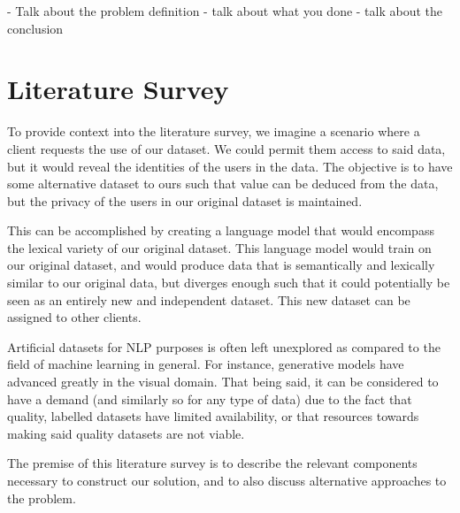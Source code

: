 \documentclass[12pt,twoside]{report}
\begin{document}
- Talk about the problem definition
- talk about what you done
- talk about the conclusion



\chapter{Literature Survey}




To provide context into the literature survey, we imagine a scenario where a client requests the use of our dataset. We could permit them access to said data, but it would reveal the identities of the users in the data. The objective is to have some alternative dataset to ours such that value can be deduced from the data, but the privacy of the users in our original dataset is maintained.

This can be accomplished by creating a language model that would encompass the lexical variety of our original dataset. This language model would train on our original dataset, and would produce data that is semantically and lexically similar to our original data, but diverges enough such that it could potentially be seen as an entirely new and independent dataset. This new dataset can be assigned to other clients.

Artificial datasets for NLP purposes is often left unexplored as compared to the field of machine learning in general. For instance, generative models have advanced greatly in the visual domain. That being said, it can be considered to have a demand (and similarly so for any type of data) due to the fact that quality, labelled datasets have limited availability, or that resources towards making said quality datasets are not viable. 

The premise of this literature survey is to describe the relevant components necessary to construct our solution, and to also discuss alternative approaches to the problem. 
\end{document}

